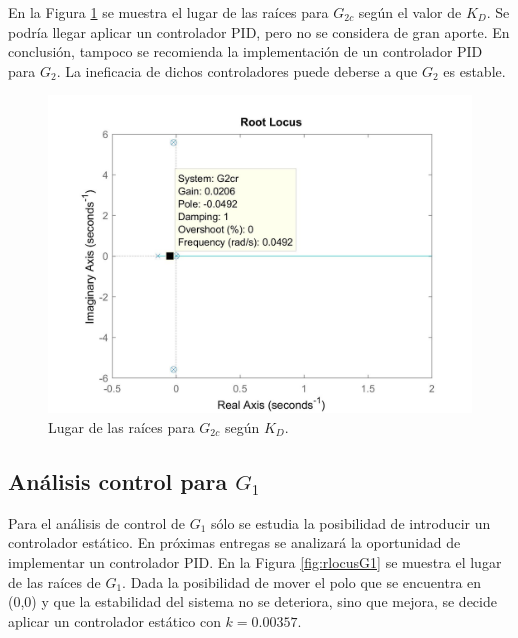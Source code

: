 \documentclass[journal]{IEEEtran}
\begin{document}
En la Figura \ref{fig:rlocusG2PID} se muestra el lugar de las raíces para $G_{2c}$ según el valor de $K_D$. Se podría llegar aplicar un controlador PID, pero no se considera de gran aporte. En conclusión, tampoco se recomienda la implementación de un controlador PID para $G_2$. La ineficacia de dichos controladores puede deberse a que $G_2$ es estable. 

\begin{figure}[h!]
\caption{Lugar de las raíces para $G_{2c}$ según $K_D$.\label{fig:rlocusG2PID}}
  \centering
\includegraphics[scale=0.18]{control/PID_G2.jpg}
\end{figure}

\subsection{Análisis control para $G_1$}
Para el análisis de control de $G_1$ sólo se estudia la posibilidad de introducir un controlador estático. En próximas entregas se analizará la oportunidad de implementar un controlador PID. En la Figura \ref{fig:rlocusG1} se muestra el lugar de las raíces de $G_1$. Dada la posibilidad de mover el polo que se encuentra en (0,0) y que la estabilidad del sistema no se deteriora, sino que mejora, se decide aplicar un controlador estático con $k=0.00357$.\\   
\end{document}
